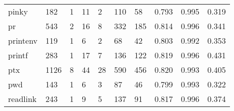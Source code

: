 \begin{longtable}{lp{2.0cm}p{2.0cm}p{2.0cm}p{2.0cm}p{2.0cm}p{2.0cm}p{2.0cm}p{2.0cm}p{2.0cm}}
pinky     &                    182 &                                  1 &                                11 &                                2 &                               110 &                              58 &                                   0.793 &                                  0.995 &                                0.319 \\
pr        &                    543 &                                  2 &                                16 &                                8 &                               332 &                             185 &                                   0.814 &                                  0.996 &                                0.341 \\
printenv  &                    119 &                                  1 &                                 6 &                                2 &                                68 &                              42 &                                   0.803 &                                  0.992 &                                0.353 \\
printf    &                    283 &                                  1 &                                17 &                                7 &                               136 &                             122 &                                   0.819 &                                  0.996 &                                0.431 \\
ptx       &                   1126 &                                  8 &                                44 &                               28 &                               590 &                             456 &                                   0.820 &                                  0.993 &                                0.405 \\
pwd       &                    143 &                                  1 &                                 6 &                                3 &                                87 &                              46 &                                   0.799 &                                  0.993 &                                0.322 \\
readlink  &                    243 &                                  1 &                                 9 &                                5 &                               137 &                              91 &                                   0.817 &                                  0.996 &                                0.374 \\

\end{longtable}
